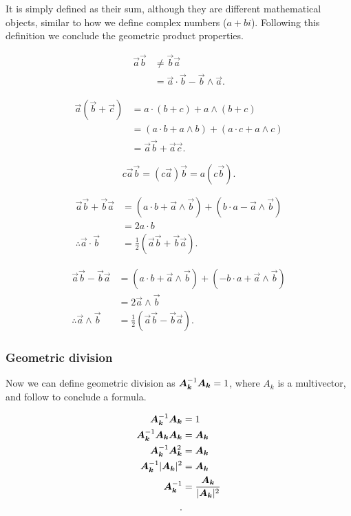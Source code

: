 It is simply defined as their sum, although they are different mathematical objects, similar to how we define complex numbers ($a+bi$). Following this definition we conclude the geometric product properties.

\begin{align*}
    \vec{a}\vec{b} &\neq \vec{b}\vec{a} \\
                   &= \vec{a}\cdot \vec{b}-\vec{b}\wedge \vec{a}
.\end{align*}

\begin{align*}
    \vec{a}(\vec{b}+\vec{c}) &= a\cdot(b+c) + a\wedge(b+c) \\
                             &= ( a\cdot b + a\wedge b ) + ( a\cdot c + a\wedge c ) \\
                             &= \vec{a}\vec{b} + \vec{a}\vec{c}
.\end{align*}

\[
    c \vec{a}\vec{b}=(c \vec{a})\vec{b} = a(c \vec{b})
.\]

\begin{align*}
    \vec{a}\vec{b}+\vec{b}\vec{a} &= ( a \cdot b + \vec{a}\wedge \vec{b} ) + ( b \cdot a - \vec{a}\wedge \vec{b} ) \\
                                  &= 2 a \cdot b \\
    \therefore \vec{a} \cdot \vec{b} &= \frac{1}{2}(\vec{a}\vec{b}+\vec{b}\vec{a})
.\end{align*}

\begin{align*}
    \vec{a}\vec{b}-\vec{b}\vec{a} &= ( a \cdot b + \vec{a}\wedge \vec{b} ) + ( - b \cdot a + \vec{a}\wedge \vec{b} ) \\
                                  &= 2 \vec{a} \wedge \vec{b} \\
    \therefore \vec{a} \wedge \vec{b} &= \frac{1}{2}(\vec{a}\vec{b}-\vec{b}\vec{a})
.\end{align*}

\subsubsection{Geometric division}%
\label{ssub:geometric-division}

Now we can define geometric division as $\bm{A_k}^{-1}\bm{A_k}=1$, where $A_k$ is a multivector, and follow to conclude a formula.

\begin{align*}
    \bm{A_k}^{-1}\bm{A_k}&=1 \\
    \bm{A_k}^{-1}\bm{A_k}\bm{A_k}&=\bm{A_k} \\
    \bm{A_k}^{-1}\bm{A_k}^2&=\bm{A_k} \\
    \bm{A_k}^{-1}|\bm{A_k}|^2&=\bm{A_k} \\
    \bm{A_k}^{-1}&=\frac{\bm{A_k}}{|\bm{A_k}|^2} \\
.\end{align*}

